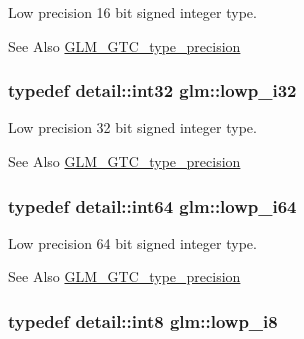 Low precision 16 bit signed integer type. \begin{DoxySeeAlso}{See Also}
\hyperlink{group__gtc__type__precision}{G\-L\-M\-\_\-\-G\-T\-C\-\_\-type\-\_\-precision} 
\end{DoxySeeAlso}
\hypertarget{group__gtc__type__precision_ga70fd34e8b8cffc92739161284ed77328}{
\subsubsection[{lowp\-\_\-i32}]{\setlength{\rightskip}{0pt plus 5cm}typedef detail\-::int32 {\bf glm\-::lowp\-\_\-i32}}}\label{group__gtc__type__precision_ga70fd34e8b8cffc92739161284ed77328}
Low precision 32 bit signed integer type. \begin{DoxySeeAlso}{See Also}
\hyperlink{group__gtc__type__precision}{G\-L\-M\-\_\-\-G\-T\-C\-\_\-type\-\_\-precision} 
\end{DoxySeeAlso}
\hypertarget{group__gtc__type__precision_ga1f4ded25f71c0f3b4518936d50b54b6e}{
\subsubsection[{lowp\-\_\-i64}]{\setlength{\rightskip}{0pt plus 5cm}typedef detail\-::int64 {\bf glm\-::lowp\-\_\-i64}}}\label{group__gtc__type__precision_ga1f4ded25f71c0f3b4518936d50b54b6e}
Low precision 64 bit signed integer type. \begin{DoxySeeAlso}{See Also}
\hyperlink{group__gtc__type__precision}{G\-L\-M\-\_\-\-G\-T\-C\-\_\-type\-\_\-precision} 
\end{DoxySeeAlso}
\hypertarget{group__gtc__type__precision_gaa2e13ee29c90f75658beed6082541097}{
\subsubsection[{lowp\-\_\-i8}]{\setlength{\rightskip}{0pt plus 5cm}typedef detail\-::int8 {\bf glm\-::lowp\-\_\-i8}}}\label{group__gtc__type__precision_gaa2e13ee29c90f75658beed6082541097}

